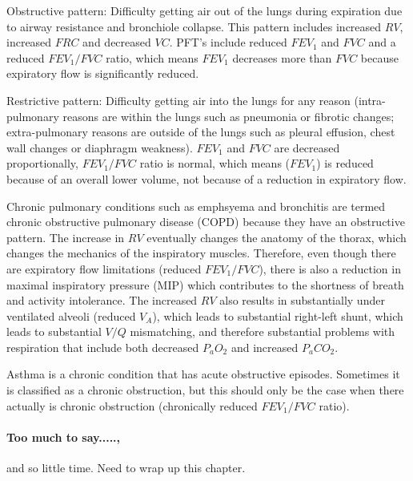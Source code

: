 \begin{itemi}
\item Obstructive pattern: Difficulty getting air out of the lungs during expiration due to airway resistance and bronchiole collapse. This pattern includes increased $RV$, increased $FRC$ and decreased $VC$. PFT's include reduced $FEV_1$ and $FVC$ and a reduced $FEV_1/FVC$ ratio, which means $FEV_1$ decreases more than $FVC$ because expiratory flow is significantly reduced.
\item Restrictive pattern: Difficulty getting air into the lungs for any reason (intra-pulmonary reasons are within the lungs such as pneumonia or fibrotic changes; extra-pulmonary reasons are outside of the lungs such as pleural effusion, chest wall changes or diaphragm weakness). $FEV_1$ and $FVC$ are decreased proportionally, $FEV_1/FVC$ ratio is normal, which means ($FEV_1$) is reduced because of an overall lower volume, not because of a reduction in expiratory flow.
\end{itemi}

Chronic pulmonary conditions such as emphsyema and bronchitis are termed chronic obstructive pulmonary disease (COPD) because they have an obstructive pattern. The increase in $RV$ eventually changes the anatomy of the thorax, which changes the mechanics of the inspiratory muscles. Therefore, even though there are expiratory flow limitations (reduced $FEV_1/FVC$), there is also a reduction in maximal inspiratory pressure (MIP) which contributes to the shortness of breath and activity intolerance. The increased $RV$ also results in substantially under ventilated alveoli (reduced $V_A$), which leads to substantial right-left shunt, which leads to substantial $V/Q$ mismatching, and therefore substantial problems with respiration that include both decreased $P_aO_2$ and increased $P_aCO_2$.

Asthma is a chronic condition that has acute obstructive episodes. Sometimes it is classified as a chronic obstruction, but this should only be the case when there actually is chronic obstruction (chronically reduced $FEV_1/FVC$ ratio).

\paragraph{Too much to say.....,} and so little time. Need to wrap up this chapter.

